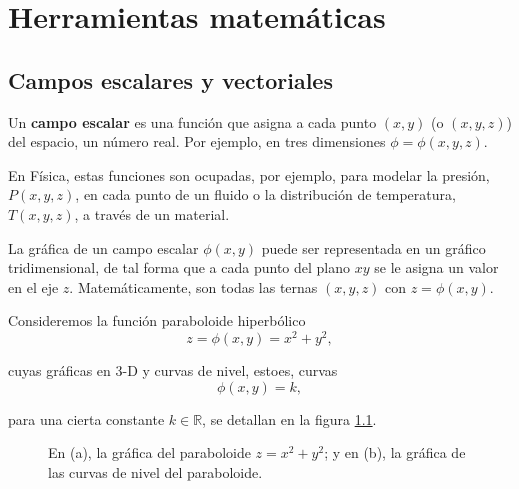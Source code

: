 \chapter{Herramientas matemáticas}

\section{Campos escalares y vectoriales }

Un \textbf{campo escalar} es una función que asigna a cada punto $(x,y)$ (o $(x,y,z)$) del espacio, un número real. Por ejemplo, en tres dimensiones $\phi = \phi(x,y,z)$. 

En Física, estas funciones son ocupadas, por ejemplo, para modelar la presión, $P(x,y,z)$, en cada punto de un fluido o la distribución de temperatura, $T(x,y,z)$, a través de un material. 

La gráfica de un campo escalar $\phi(x,y)$ puede ser representada en un gráfico tridimensional, de tal forma que a cada punto del plano $xy$ se le asigna un valor en el eje $z$. Matemáticamente, son todas las ternas $(x,y,z)$ con $z = \phi(x,y)$. 

\begin{ejemplo}
    Consideremos la función paraboloide hiperbólico
    $$z = \phi(x,y) = x^2+y^2,$$

    cuyas gráficas en 3-D y curvas de nivel, estoes, curvas
    $$\phi(x,y) = k,$$

    para una cierta constante $k \in \mathbb{R}$, se 
    detallan en la figura \ref{fig:CampoEscalar}.

    \begin{figure}[H]
        \centering
         \hspace{1cm}
        \caption{En (a), la gráfica del paraboloide $z = x^2+y^2$; y en (b), la gráfica de las curvas de nivel del paraboloide.}
        \label{fig:CampoEscalar}
    \end{figure}
\end{ejemplo}

